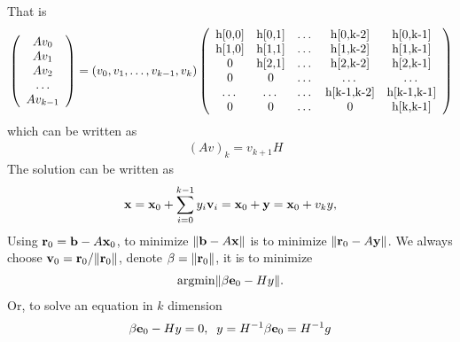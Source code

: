 That is
\begin{equation}
\begin{split}
&\left(\begin{array}{c}Av_0 \\ Av_1 \\ Av_2 \\ \ldots \\ Av_{k-1}\end{array}\right)=\left(v_0,v_1,\ldots,v_{k-1},v_k\right)\left(\begin{array}{ccccc}
$h[0,0]$ & $h[0,1]$ & $\ldots$ & $h[0,k-2]$ & $h[0,k-1]$ \\
$h[1,0]$ & $h[1,1]$ & $\ldots$ & $h[1,k-2]$ & $h[1,k-1]$ \\
$0$ & $h[2,1]$ & $\ldots$ & $h[2,k-2]$ & $h[2,k-1]$ \\
$0$ & $0$ & $\ldots$ & $\ldots$ & $\ldots$ \\
$\ldots$ & $\ldots$ & $\ldots$ & $h[k-1,k-2]$ & $h[k-1,k-1]$ \\
$0$ & $0$ & $\ldots$ & $0$ & $h[k,k-1]$ \\
\end{array}\right)\\
\end{split}
\end{equation}
which can be written as
\begin{equation}
\begin{split}
&(Av)_k=v_{k+1}H
\end{split}
\end{equation}
The solution can be written as
\begin{equation}
\begin{split}
&{\bf x}={\bf x}_0 + \sum _{i=0}^{k-1} y_i {\bf v}_i={\bf x}_0+{\bf y}={\bf x}_0+v_ky,\\
\end{split}
\end{equation}
Using ${\bf r}_0={\bf b}-A{\bf x}_0$, to minimize $\|{\bf b}-A{\bf x}\|$ is to minimize $\|{\bf r}_0-A{\bf y}\|$. We always choose ${\bf v}_0={\bf r}_0/\|{\bf r}_0\|$, denote $\beta = \|{\bf r}_0\|$, it is to minimize
\begin{equation}
\begin{split}
&{\rm argmin}\|\beta {\bf e}_0 - Hy\|.\\
\end{split}
\end{equation}
Or, to solve an equation in $k$ dimension
\begin{equation}
\begin{split}
&\beta {\bf e}_0 - Hy=0,\;\;y=H^{-1}\beta {\bf e}_0=H^{-1} g\\
\end{split}
\end{equation}

